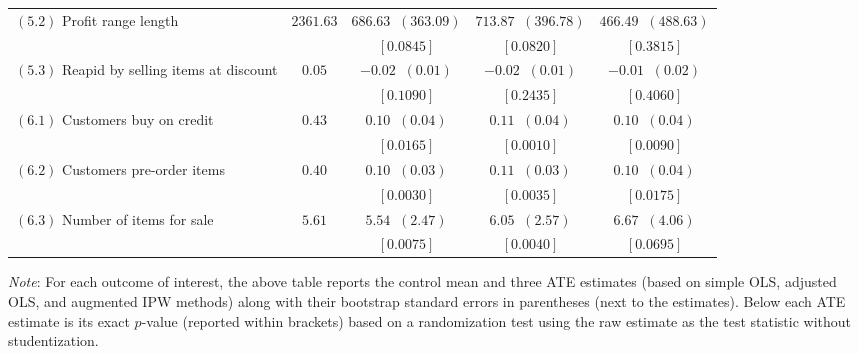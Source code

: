 \begin{table}[!ht]
\begin{center}
\begin{tabular}{l|c@{\hskip 10pt}|c@{\hskip 10pt}|c@{\hskip 10pt}|c}
 $ (5.2) $ Profit range length & $ 2361.63 $  & $ 686.63 \;\; ( 363.09 ) $  & $ 713.87 \;\; ( 396.78 ) $  & $ 466.49 \;\; ( 488.63 ) $ \\ [-1mm]
 &  & $ [ \mathbf { 0.0845 }  ] $ & $ [ \mathbf { 0.0820 }  ] $ & $ [0.3815 ] $ \\ \hline
 $ (5.3) $ Reapid by selling items at discount & $ 0.05 $  & $ -0.02 \;\; ( 0.01 ) $  & $ -0.02 \;\; ( 0.01 ) $  & $ -0.01 \;\; ( 0.02 ) $ \\ [-1mm]
 &  & $ [0.1090 ] $ & $ [0.2435 ] $ & $ [0.4060 ] $ \\ \hline
\hline
 $ (6.1) $ Customers buy on credit & $ 0.43 $  & $ 0.10 \;\; ( 0.04 ) $  & $ 0.11 \;\; ( 0.04 ) $  & $ 0.10 \;\; ( 0.04 ) $ \\ [-1mm]
 &  & $ [ \mathbf { 0.0165 }  ] $ & $ [ \mathbf { 0.0010 }  ] $ & $ [ \mathbf { 0.0090 }  ] $ \\ \hline
 $ (6.2) $ Customers pre-order items & $ 0.40 $  & $ 0.10 \;\; ( 0.03 ) $  & $ 0.11 \;\; ( 0.03 ) $  & $ 0.10 \;\; ( 0.04 ) $ \\ [-1mm]
 &  & $ [ \mathbf { 0.0030 }  ] $ & $ [ \mathbf { 0.0035 }  ] $ & $ [ \mathbf { 0.0175 }  ] $ \\ \hline
 $ (6.3) $ Number of items for sale & $ 5.61 $  & $ 5.54 \;\; ( 2.47 ) $  & $ 6.05 \;\; ( 2.57 ) $  & $ 6.67 \;\; ( 4.06 ) $ \\ [-1mm]
 &  & $ [ \mathbf { 0.0075 }  ] $ & $ [ \mathbf { 0.0040 }  ] $ & $ [ \mathbf { 0.0695 }  ] $ \\ \hline
\hline
\end{tabular}
\end{center} \vspace{-2mm}
\noindent \scriptsize
\textit{Note}: For each outcome of interest, the above table reports the control mean and three ATE estimates (based on simple OLS, adjusted OLS, and augmented IPW methods) along with their bootstrap standard errors in parentheses (next to the estimates). Below each ATE estimate is its exact $ p$-value (reported within brackets) based on a randomization test using the raw estimate as the test statistic without studentization.
\end{table}
